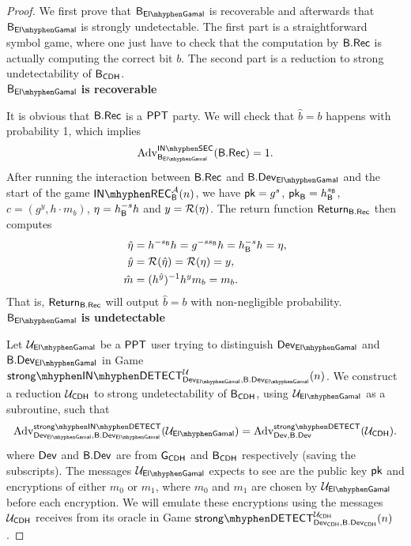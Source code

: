 \begin{proof}
We first prove that $\bb_{\elGamal}$ is recoverable and afterwards that $\bb_{\elGamal}$ is strongly undetectable. The first part is a straightforward symbol game, where one just have to check that the computation by $\mathsf{B}.\mathsf{Rec}$ is actually computing the correct bit $b$. The second part is a reduction to strong undetectability of $\mathsf{B}_{\mathsf{CDH}}$. \\

\noindent\textbf{$\bb_{\elGamal}$ is recoverable} 

It is obvious that $\mathsf{B}.\mathsf{Rec}$ is a $\mathsf{PPT}$ party. We will check that $\hat{b} = b$ happens with probability 1, which implies
\begin{align*}
	\adv_{\bb_{\elGamal}}^{\insecgame}(\bbrec) = 1. 
\end{align*}
After running the interaction between $\mathsf{B}.\mathsf{Rec}$ and $\bbdev_{\elGamal}$ and the start of the game $\inrecgame_{\bb}^{\adve}(n)$, we have $\mathsf{pk} = g^s$, $\mathsf{pk}_{\mathsf{B}} = h_{\mathsf{B}}^{s_{\mathsf{B}}}$, $c = (g^y,h\cdot m_b)$, $\eta = h_{\mathsf{B}}^{-s}h$ and $y = \operatorname{\mathcal{R}}(\eta)$. The return function $\operatorname{\mathsf{Return}}_{\mathsf{B}.\mathsf{Rec}}$ then computes
\begin{align*}
	\hat{\eta} &= h^{-s_{\mathsf{B}}}h = g^{-ss_{\mathsf{B}}}h = h_{\mathsf{B}}^{-s}h = \eta, \\
	\hat{y} &= \operatorname{\mathcal{R}}(\hat{\eta}) = \operatorname{\mathcal{R}}(\eta) = y, \\
	\hat{m} &= (h^{\hat{y}})^{-1} h^y m_b = m_b. 
\end{align*} 
That is, $\operatorname{\mathsf{Return}}_{\mathsf{B}.\mathsf{Rec}}$ will output $\hat{b} = b$ with non-negligible probability. \\

\newpage
\noindent\textbf{$\bb_{\elGamal}$ is undetectable}

Let $\user_{\elGamal}$ be a $\mathsf{PPT}$ user trying to distinguish $\dev_{\elGamal}$ and $\bbdev_{\elGamal}$ in Game \\$\instrongdetect{\dev_{\elGamal}}{\bbdev_{\elGamal}}{\user}$. We construct a reduction $\mathcal{U}_{\mathsf{CDH}}$ to strong undetectability of $\mathsf{B}_{\mathsf{CDH}}$, using $\user_{\elGamal}$ as a subroutine, such that 
\begin{align}
\label{eq:5}
	\adv_{\dev_{\elGamal},\bbdev_{\elGamal}}^{\instrongdetectplain}(\user_{\elGamal}) = \adv_{\dev,\bbdev}^{\strongdetectplain}(\user_{\CDH}).
\end{align}
where $\operatorname{\mathsf{Dev}}$ and $\mathsf{B}.\mathsf{Dev}$ are from $\operatorname{\mathsf{G}}_{\mathsf{CDH}}$ and $\mathsf{B}_{\mathsf{CDH}}$ respectively (saving the subscripts). The messages $\user_{\elGamal}$ expects to see are the public key $\mathsf{pk}$ and encryptions of either $m_0$ or $m_1$, where $m_0$ and $m_1$ are chosen by $\user_{\elGamal}$ before each encryption. We will emulate these encryptions using the messages $\mathcal{U}_{\mathsf{CDH}}$ receives from its oracle in Game $\strongdetect{\dev_{\CDH}}{\bbdev_{\CDH}}{\user_{\CDH}}$.


\end{proof}
